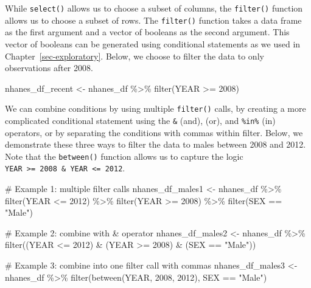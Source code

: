 \documentclass[
  letterpaper,
]{krantz}
\makeatletter
\newenvironment{Shaded}{\begin{snugshade}}{\end{snugshade}}
\newcommand{\CommentTok}[1]{\textcolor[rgb]{0.37,0.37,0.37}{#1}}
\newcommand{\DecValTok}[1]{\textcolor[rgb]{0.68,0.00,0.00}{#1}}
\newcommand{\FunctionTok}[1]{\textcolor[rgb]{0.28,0.35,0.67}{#1}}
\newcommand{\NormalTok}[1]{\textcolor[rgb]{0.00,0.23,0.31}{#1}}
\newcommand{\OtherTok}[1]{\textcolor[rgb]{0.00,0.23,0.31}{#1}}
\newcommand{\SpecialCharTok}[1]{\textcolor[rgb]{0.37,0.37,0.37}{#1}}
\newcommand{\StringTok}[1]{\textcolor[rgb]{0.13,0.47,0.30}{#1}}
\newenvironment{kframe}{%
\medskip{}
\setlength{\fboxsep}{.8em}
 \def\at@end@of@kframe{}%
 \ifinner\ifhmode%
  \def\at@end@of@kframe{\end{minipage}}%
  \begin{minipage}{\columnwidth}%
 \fi\fi%
 \def\FrameCommand##1{\hskip\@totalleftmargin \hskip-\fboxsep
 \colorbox{shadecolor}{##1}\hskip-\fboxsep
     \hskip-\linewidth \hskip-\@totalleftmargin \hskip\columnwidth}%
 \MakeFramed {\advance\hsize-\width
   \@totalleftmargin\z@ \linewidth\hsize
   \@setminipage}}%
 {\par\unskip\endMakeFramed%
 \at@end@of@kframe}
\renewenvironment{Shaded}{\begin{kframe}}{\end{kframe}}
\makeatother
\begin{document}
While \texttt{select()} allows us to choose a subset of columns, the
\texttt{filter()} function allows us to choose a subset of rows. The
\texttt{filter()} function takes a data frame as the first argument and
a vector of booleans as the second argument. This vector of booleans can
be generated using conditional statements as we used in
Chapter~\ref{sec-exploratory}. Below, we choose to filter the data to
only observations after 2008.

\begin{Shaded}
\begin{Highlighting}[]
\NormalTok{nhanes\_df\_recent }\OtherTok{\textless{}{-}}\NormalTok{ nhanes\_df }\SpecialCharTok{\%\textgreater{}\%} \FunctionTok{filter}\NormalTok{(YEAR }\SpecialCharTok{\textgreater{}=} \DecValTok{2008}\NormalTok{)}
\end{Highlighting}
\end{Shaded}

We can combine conditions by using multiple \texttt{filter()} calls, by
creating a more complicated conditional statement using the \texttt{\&}
(and), \texttt{\textbar{}} (or), and \texttt{\%in\%} (in) operators, or
by separating the conditions with commas within filter. Below, we
demonstrate these three ways to filter the data to males between 2008
and 2012. Note that the \texttt{between()} function allows us to capture
the logic
\texttt{YEAR\ \textgreater{}=\ 2008\ \&\ YEAR\ \textless{}=\ 2012}.

\begin{Shaded}
\begin{Highlighting}[]
\CommentTok{\# Example 1: multiple filter calls}
\NormalTok{nhanes\_df\_males1 }\OtherTok{\textless{}{-}}\NormalTok{ nhanes\_df }\SpecialCharTok{\%\textgreater{}\%}
  \FunctionTok{filter}\NormalTok{(YEAR }\SpecialCharTok{\textless{}=} \DecValTok{2012}\NormalTok{) }\SpecialCharTok{\%\textgreater{}\%}
  \FunctionTok{filter}\NormalTok{(YEAR }\SpecialCharTok{\textgreater{}=} \DecValTok{2008}\NormalTok{) }\SpecialCharTok{\%\textgreater{}\%}
  \FunctionTok{filter}\NormalTok{(SEX }\SpecialCharTok{==} \StringTok{"Male"}\NormalTok{)}

\CommentTok{\# Example 2: combine with \& operator}
\NormalTok{nhanes\_df\_males2 }\OtherTok{\textless{}{-}}\NormalTok{ nhanes\_df }\SpecialCharTok{\%\textgreater{}\%}
  \FunctionTok{filter}\NormalTok{((YEAR }\SpecialCharTok{\textless{}=} \DecValTok{2012}\NormalTok{) }\SpecialCharTok{\&}\NormalTok{ (YEAR }\SpecialCharTok{\textgreater{}=} \DecValTok{2008}\NormalTok{) }\SpecialCharTok{\&}\NormalTok{ (SEX }\SpecialCharTok{==} \StringTok{"Male"}\NormalTok{))}

\CommentTok{\# Example 3: combine into one filter call with commas}
\NormalTok{nhanes\_df\_males3 }\OtherTok{\textless{}{-}}\NormalTok{ nhanes\_df }\SpecialCharTok{\%\textgreater{}\%}
  \FunctionTok{filter}\NormalTok{(}\FunctionTok{between}\NormalTok{(YEAR, }\DecValTok{2008}\NormalTok{, }\DecValTok{2012}\NormalTok{), SEX }\SpecialCharTok{==} \StringTok{"Male"}\NormalTok{)}
\end{Highlighting}
\end{Shaded}
\end{document}
